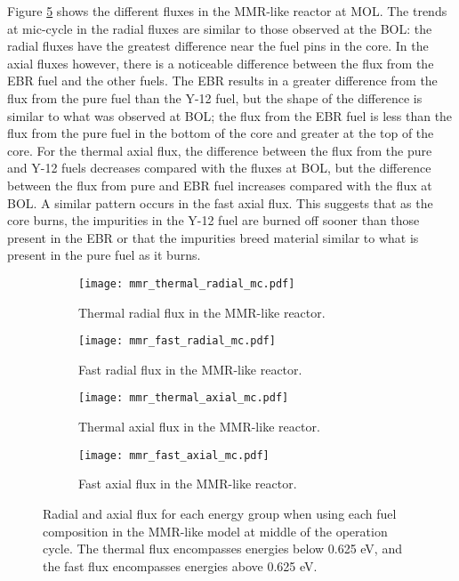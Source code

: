 Figure \ref{fig:mmr_mc} shows the different fluxes in the \gls{MMR}-like 
reactor at \gls{MOL}. The trends at mic-cycle in the radial fluxes are 
similar to those observed at the \gls{BOL}: the radial fluxes have the 
greatest difference near the fuel pins in the core. In the axial fluxes 
however, there is a noticeable difference between the flux from the \gls{EBR} 
fuel and the other fuels. The \gls{EBR} results in a greater difference 
from the flux from the pure fuel than the Y-12 fuel, but the shape of 
the difference is similar to what was observed at \gls{BOL}; the flux from 
the \gls{EBR} fuel is less than the flux from the pure fuel in the bottom of 
the core and greater at the top of the core. For the thermal axial flux, 
the difference between the flux from the pure and Y-12 fuels decreases 
compared with the fluxes at \gls{BOL}, but the difference between the flux 
from pure and \gls{EBR} fuel increases compared with the flux at \gls{BOL}. 
A similar pattern occurs in the fast axial flux. This suggests that 
as the core burns, the impurities in the Y-12 fuel are burned off sooner 
than those present in the \gls{EBR} or that the impurities breed material 
similar to what is present in the pure fuel as it burns. 

\begin{figure}[h!]
        \centering
        \begin{subfigure}[b]{0.48\textwidth}
            \centering
            \texttt{[image: mmr\_thermal\_radial\_mc.pdf]}
            \caption{Thermal radial flux in the \gls{MMR}-like reactor.}
            \label{fig:mmr_thermal_radial_mc}
        \end{subfigure}
        \hfill
        \begin{subfigure}[b]{0.48\textwidth}
            \centering
            \texttt{[image: mmr\_fast\_radial\_mc.pdf]}
            \caption{Fast radial flux in the \gls{MMR}-like reactor.}
            \label{fig:mmr_fast_radial_mc}
        \end{subfigure}
        \hfill
            
        \begin{subfigure}[b]{0.48\textwidth}
            \centering
            \texttt{[image: mmr\_thermal\_axial\_mc.pdf]}
            \caption{Thermal axial flux in the \gls{MMR}-like reactor. }
            \label{fig:mmr_thermal_axial_mc}
        \end{subfigure}
        \hfill
        \begin{subfigure}[b]{0.48\textwidth}
            \centering
            \texttt{[image: mmr\_fast\_axial\_mc.pdf]}
            \caption{Fast axial flux in the \gls{MMR}-like reactor.}
            \label{fig:mmr_fast_axial_mc}
        \end{subfigure}
        \hfill
        \caption{Radial and axial flux for each energy group when using 
        each fuel composition in the \gls{MMR}-like model at middle of 
        the operation cycle. The thermal flux encompasses energies below 
        0.625 eV, and the 
        fast flux encompasses energies above 0.625 eV.}
        \label{fig:mmr_mc}
   \end{figure}

